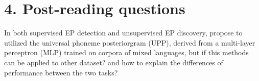 \documentclass[nobib]{tufte-handout}
\begin{document}
\bigskip
\section{4. \textbf{Post-reading questions}}
In both supervised EP detection and unsupervised EP discovery, \cite{wang2015supervised} propose to utilized the universal phoneme posteriorgram (UPP), derived from a multi-layer perceptron (MLP) trained on corpora of mixed languages, but if this methods can be applied to other dataset? and how to explain the differences of performance between the  two tasks?






\end{document}
